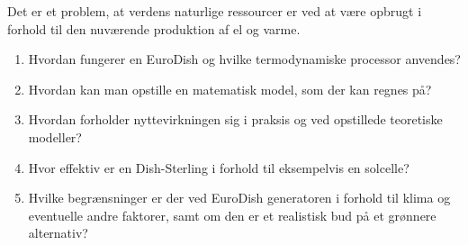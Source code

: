 \documentclass[SRC.tex]{subfiles}
\begin{document}
	Det er et problem, at verdens naturlige ressourcer er ved at være opbrugt i forhold til den nuværende produktion af el og varme.  
	\begin{enumerate}[-]
		\item Hvordan fungerer en EuroDish og hvilke termodynamiske processor anvendes?
		\item Hvordan kan man opstille en matematisk model, som der kan regnes på?
		\item Hvordan forholder nyttevirkningen sig i praksis og ved opstillede teoretiske modeller?
		\item Hvor effektiv er en Dish-Sterling i forhold til eksempelvis en solcelle?
		\item Hvilke begrænsninger er der ved  EuroDish generatoren i forhold til klima og eventuelle andre faktorer, samt om den er et realistisk bud på et grønnere alternativ? 
	\end{enumerate} 
\end{document}
